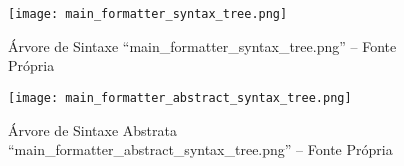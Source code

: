 \begin{figure}[h]
\centering
\texttt{[image: main\_formatter\_syntax\_tree.png]}
\caption[Árvore de Sintaxe ``main\_formatter\_syntax\_tree.png'']
{Árvore de Sintaxe ``main\_formatter\_syntax\_tree.png'' -- Fonte Própria}
\label{MainFormatterSyntaxTree}
\end{figure}

\begin{figure}[h]
\centering
\texttt{[image: main\_formatter\_abstract\_syntax\_tree.png]}
\caption[Árvore de Sintaxe Abstrata ``main\_formatter\_abstract\_syntax\_tree.png'']
{Árvore de Sintaxe Abstrata ``main\_formatter\_abstract\_syntax\_tree.png'' -- Fonte Própria}
\label{MainFormatterAbstractSyntaxTree}
\end{figure}

